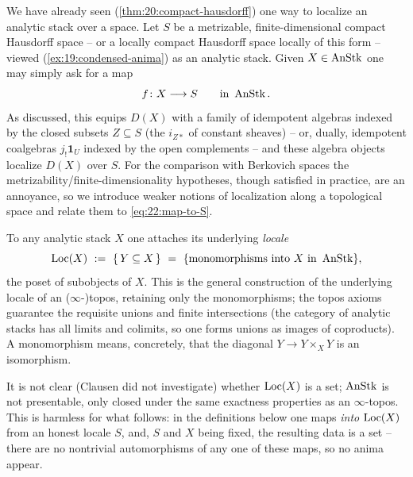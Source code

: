 We have already seen (\cref{thm:20:compact-hausdorff}) one way to localize an
analytic stack over a space. Let $S$ be a metrizable, finite-dimensional
compact Hausdorff space -- or a locally compact Hausdorff space locally of
this form -- viewed (\cref{ex:19:condensed-anima}) as an analytic stack. Given
$X\in\operatorname{AnStk}$ one may simply ask for a map
\begin{equation}
\label{eq:22:map-to-S}
f\colon X\longrightarrow S \qquad\text{in }\operatorname{AnStk} .
\end{equation}
As discussed, this equips $D(X)$ with a family of idempotent algebras indexed by
the closed subsets $Z\subseteq S$ (the $i_{Z*}$ of constant sheaves) -- or,
dually, idempotent coalgebras $j_!\mathbf 1_U$ indexed by the open complements
-- and these algebra objects localize $D(X)$ over $S$. For the comparison with
Berkovich spaces the metrizability/finite-dimensionality hypotheses, though
satisfied in practice, are an annoyance, so we introduce weaker notions of
localization along a topological space and relate them to
\eqref{eq:22:map-to-S}.

To any analytic stack $X$ one attaches its underlying \emph{locale}
\begin{equation*}
\Loc(X)\ :=\ \{\,Y\subseteq X\,\}\ =\ \{\text{monomorphisms into }X\text{ in
}\AnStk\},
\end{equation*}
the poset of subobjects of $X$. This is the general construction of the
underlying locale of an ($\infty$-)topos, retaining only the monomorphisms; the
topos axioms guarantee the requisite unions and finite intersections (the
category of analytic stacks has all limits and colimits, so one forms unions as
images of coproducts). A monomorphism means, concretely, that the diagonal
$Y\to Y\times_X Y$ is an isomorphism.

\begin{remark}
\label{rmk:22:size}
It is not clear (Clausen did not investigate) whether $\operatorname{Loc}(X)$ is a set;
$\operatorname{AnStk}$ is not presentable, only closed under the same exactness properties as
an $\infty$-topos. This is harmless for what follows: in the definitions below
one maps \emph{into} $\operatorname{Loc}(X)$ from an honest locale $S$, and, $S$ and $X$ being
fixed, the resulting data is a set -- there are no nontrivial automorphisms of
any one of these maps, so no anima appear.
\end{remark}

